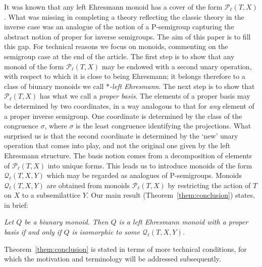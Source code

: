\documentclass[12pt]{amsart}
\theoremstyle{definition}
\theoremstyle{definition}
\numberwithin{them}{section}
\numberwithin{equation}{section}
\newcommand{\QQ}{\mbox{$\mathcal{Q}_\ell$}}
\begin{document}
It was known that any left Ehresmann monoid 
has a cover of the form $\mathcal{P}_{\ell}(T,X)$ \cite{GG}. What was missing in completing a theory reflecting the classic theory in the inverse case was an  analogue of the notion of a P-semigroup capturing the abstract notion of proper for inverse semigroups.  The aim of this paper is to fill this gap. 
 For technical reasons  we focus on  monoids, commenting on the semigroup case at the end of the article.   The first step is to show that any monoid of the form $\mathcal{P}_{\ell}(T,X)$ may be endowed with a second unary operation, with respect to which it is close to being Ehresmann; it belongs therefore to a class of biunary monoids we call {\em $*$-left Ehresmann}. The next  step is to show that $\mathcal{P}_{\ell}(T,X)$  has what we call a {\em proper basis}. The elements of a proper basis may be determined by two coordinates, in a way analogous to that for {\em any} element of a proper inverse semigroup. One coordinate is determined by the class of the congruence $\sigma$,
 where $\sigma$ is the least congruence identifying the projections.  What surprised us is that the second coordinate is determined by the `new' unary operation that comes into play, and not the original one given by the left  Ehresmann structure. The basis notion comes from a decomposition of elements of $\mathcal{P}_{\ell}(T,X)$ into unique  forms. This leads us to introduce monoids of the form $\QQ(T,X,Y)$ which may be regarded as 
analogues of P-semigroups. Monoids  $\QQ(T,X,Y)$ are obtained from monoids  $\mathcal{P}_{\ell}(T,X)$ by restricting the action of $T$ on $X$ to a subsemilattice $Y$. Our main result (Theorem~\ref{them:conclusion}) states, in brief:

\vspace{0.5cm}

 {\em Let $Q$ be a biunary monoid. Then $Q$ is a left Ehresmann  monoid with a proper basis if and only if $Q$ is isomorphic to some 
$\QQ(T,X,Y)$.}

\vspace{0.5cm}
 Theorem~\ref{them:conclusion} is stated in terms of more technical conditions, for which the motivation and terminology will be addressed subsequently.
\end{document}
